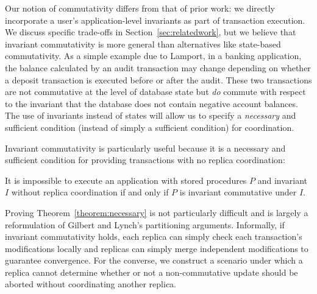  Our notion of
commutativity differs from that of prior work: we directly incorporate
a user's application-level invariants as part of transaction
execution. We discuss specific trade-offs in
Section~\ref{sec:relatedwork}, but we believe that invariant
commutativity is more general than alternatives like state-based
commutativity. As a simple example due to Lamport, in a banking
application, the balance calculated by an audit transaction may change
depending on whether a deposit transaction is executed before or after
the audit. These two transactions are not commutative at the level of
database state but \textit{do} commute with respect to the invariant
that the database does not contain negative account balances. The use
of invariants instead of states will allow us to specify a
\textit{necessary} and sufficient condition (instead of simply a
sufficient condition) for coordination. 

Invariant commutativity is particularly useful because it is a
necessary and sufficient condition for providing transactions with no
replica coordination:

\begin{theorem}
\label{theorem:necessary}
It is impossible to execute an application with stored procedures $P$ and
invariant $I$ without replica coordination if and only if $P$ is
invariant commutative under $I$.
\end{theorem}

Proving Theorem~\ref{theorem:necessary} is not particularly difficult
and is largely a reformulation of Gilbert and Lynch's partitioning
arguments. Informally, if invariant commutativity holds, each replica
can simply check each transaction's modifications locally and replicas
can simply merge independent modifications to guarantee
convergence. For the converse, we construct a scenario under which a
replica cannot determine whether or not a non-commutative update
should be aborted without coordinating another replica.

